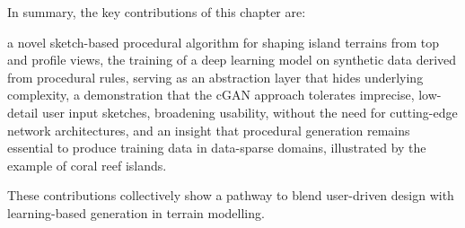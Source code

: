 In summary, the key contributions of this chapter are:
\begin{Itemize}
\Item{} a novel sketch-based procedural algorithm for shaping island terrains from top and profile views,
\Item{} the training of a deep learning model on synthetic data derived from procedural rules, serving as an abstraction layer that hides underlying complexity,
\Item{} a demonstration that the cGAN approach tolerates imprecise, low-detail user input sketches, broadening usability, without the need for cutting-edge network architectures,
\Item{} and an insight that procedural generation remains essential to produce training data in data-sparse domains, illustrated by the example of coral reef islands.
\end{Itemize}
These contributions collectively show a pathway to blend user-driven design with learning-based generation in terrain modelling.















